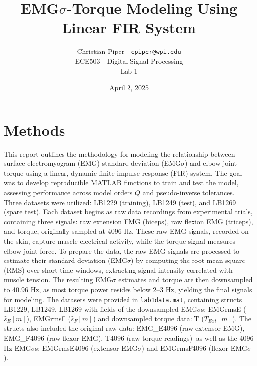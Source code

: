 \documentclass[12pt]{article}
\title{EMG$\sigma$-Torque Modeling Using Linear FIR System}
\author{Christian Piper - \texttt{cpiper@wpi.edu}\\ ECE503 - Digital Signal Processing \\ Lab 1}
\date{April 2, 2025}
\begin{document}
\maketitle

\section*{Methods}
This report outlines the methodology for modeling the relationship between surface electromyogram (EMG) standard deviation (EMG$\sigma$) and elbow joint torque using a linear, dynamic finite impulse response (FIR) system. The goal was to develop reproducible MATLAB functions to train and test the model, assessing performance across model orders $Q$ and pseudo-inverse tolerances. Three datasets were utilized: LB1229 (training), LB1249 (test), and LB1269 (spare test). Each dataset begins as raw data recordings from experimental trials, containing three signals: raw extension EMG (biceps), raw flexion EMG (triceps), and torque, originally sampled at 4096 Hz. These raw EMG signals, recorded on the skin, capture muscle electrical activity, while the torque signal measures elbow joint force. To prepare the data, the raw EMG signals are processed to estimate their standard deviation (EMG$\sigma$) by computing the root mean square (RMS) over short time windows, extracting signal intensity correlated with muscle tension. The resulting EMG$\sigma$ estimates and torque are then downsampled to 40.96 Hz, as most torque power resides below 2–3 Hz, yielding the final signals for modeling. The datasets were provided in \texttt{lab1data.mat}, containing structs LB1229, LB1249, LB1269 with fields of the downsampled EMG$\sigma$s: EMGrmsE ($\hat{s}_E[m]$), EMGrmsF ($\hat{s}_F[m]$) and downsampled torque data: T ($T_{Ext}[m]$). The structs also included the original raw data: EMG\_E4096 (raw extensor EMG), EMG\_F4096 (raw flexor EMG), T4096 (raw torque readings), as well as the 4096 Hz EMG$\sigma$s: EMGrmsE4096 (extensor EMG$\sigma$) and EMGrmsF4096 (flexor EMG$\sigma$).

\newpage
\end{document}
